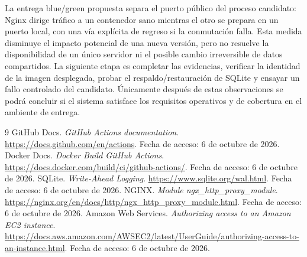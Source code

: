 \documentclass[12pt,a4paper]{article}
\begin{document}
La entrega blue/green propuesta separa el puerto público del proceso candidato: Nginx dirige tráfico a un contenedor sano mientras el otro se prepara en un puerto local, con una vía explícita de regreso si la conmutación falla. Esta medida disminuye el impacto potencial de una nueva versión, pero no resuelve la disponibilidad de un único servidor ni el posible cambio irreversible de datos compartidos. La siguiente etapa es completar las evidencias, verificar la identidad de la imagen desplegada, probar el respaldo/restauración de SQLite y ensayar un fallo controlado del candidato. Únicamente después de estas observaciones se podrá concluir si el sistema satisface los requisitos operativos y de cobertura en el ambiente de entrega.

\begin{thebibliography}{9}
 GitHub Docs. \emph{GitHub Actions documentation}. \url{https://docs.github.com/en/actions}. Fecha de acceso: 6 de octubre de 2026.
 Docker Docs. \emph{Docker Build GitHub Actions}. \url{https://docs.docker.com/build/ci/github-actions/}. Fecha de acceso: 6 de octubre de 2026.
 SQLite. \emph{Write-Ahead Logging}. \url{https://www.sqlite.org/wal.html}. Fecha de acceso: 6 de octubre de 2026.
 NGINX. \emph{Module ngx\_http\_proxy\_module}. \url{https://nginx.org/en/docs/http/ngx_http_proxy_module.html}. Fecha de acceso: 6 de octubre de 2026.
 Amazon Web Services. \emph{Authorizing access to an Amazon EC2 instance}. \url{https://docs.aws.amazon.com/AWSEC2/latest/UserGuide/authorizing-access-to-an-instance.html}. Fecha de acceso: 6 de octubre de 2026.
\end{thebibliography}
\end{document}
